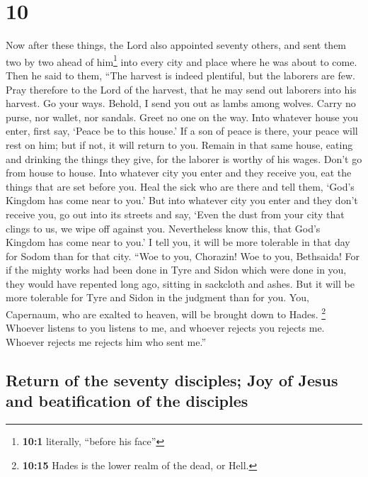 \hypertarget{section-9}{%
\section{10}\label{section-9}}

 Now after these things, the Lord also appointed seventy
others, and sent them two by two ahead of him\footnote{\textbf{10:1}
  literally, ``before his face''} into every city and place where he was
about to come.  Then he said to them, ``The harvest is
indeed plentiful, but the laborers are few. Pray therefore to the Lord
of the harvest, that he may send out laborers into his harvest.
 Go your ways. Behold, I send you out as lambs among
wolves.  Carry no purse, nor wallet, nor sandals. Greet no
one on the way.  Into whatever house you enter, first say,
`Peace be to this house.'  If a son of peace is there,
your peace will rest on him; but if not, it will return to you.
 Remain in that same house, eating and drinking the things
they give, for the laborer is worthy of his wages. Don't go from house
to house.  Into whatever city you enter and they receive
you, eat the things that are set before you.  Heal the
sick who are there and tell them, `God's Kingdom has come near to you.'
 But into whatever city you enter and they don't receive
you, go out into its streets and say,  `Even the dust
from your city that clings to us, we wipe off against you. Nevertheless
know this, that God's Kingdom has come near to you.'  I
tell you, it will be more tolerable in that day for Sodom than for that
city.  ``Woe to you, Chorazin! Woe to you, Bethsaida! For
if the mighty works had been done in Tyre and Sidon which were done in
you, they would have repented long ago, sitting in sackcloth and ashes.
 But it will be more tolerable for Tyre and Sidon in the
judgment than for you.  You, Capernaum, who are exalted
to heaven, will be brought down to Hades. \footnote{\textbf{10:15} Hades
  is the lower realm of the dead, or Hell.}  Whoever
listens to you listens to me, and whoever rejects you rejects me.
Whoever rejects me rejects him who sent me.''

\hypertarget{return-of-the-seventy-disciples-joy-of-jesus-and-beatification-of-the-disciples}{%
\subsection{Return of the seventy disciples; Joy of Jesus and
beatification of the
disciples}\label{return-of-the-seventy-disciples-joy-of-jesus-and-beatification-of-the-disciples}}

